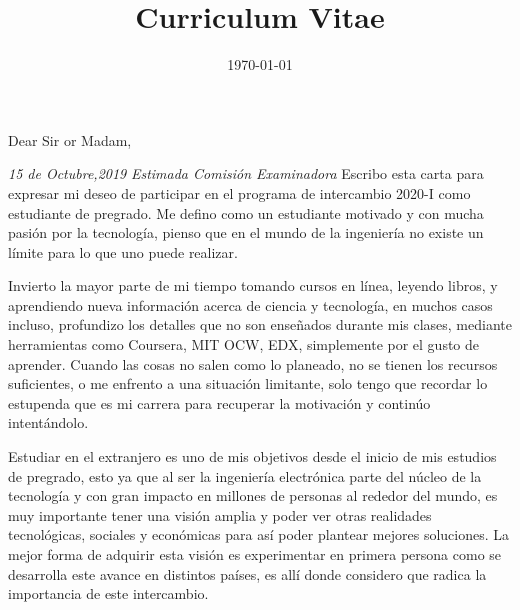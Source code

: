 \documentclass[12pt,a4paper,roman]{moderncv} %
\title{Curriculum Vitae}
\begin{document}


\clearpage

\date{\today} %
\opening{Dear Sir or Madam,} %

\justify
\textit{15 de Octubre,2019}\newline\newline
\textit{Estimada Comisión Examinadora}\newline\newline
Escribo esta carta para expresar mi deseo de participar en el programa de intercambio 2020-I como estudiante de pregrado. Me defino como un estudiante motivado y con mucha pasión por la tecnología, pienso que en el mundo de la ingeniería no existe un límite para lo que uno puede realizar.

Invierto la mayor parte de mi tiempo tomando cursos en línea, leyendo libros, y aprendiendo nueva información acerca de ciencia y tecnología, en muchos casos incluso, profundizo los detalles que no son enseñados durante mis clases, mediante herramientas como Coursera, MIT OCW, EDX, simplemente por el gusto de aprender. Cuando las cosas no salen como lo planeado, no se tienen los recursos suficientes, o me enfrento a una situación limitante, solo tengo que recordar lo estupenda que es mi carrera para recuperar la motivación y continúo intentándolo.

Estudiar en el extranjero es uno de mis objetivos desde el inicio de mis estudios de pregrado, esto ya que al ser la ingeniería electrónica parte del núcleo de la tecnología y con gran impacto en millones de personas al rededor del mundo, es muy importante tener una visión amplia y poder ver otras realidades tecnológicas, sociales y económicas para así poder plantear mejores soluciones. La mejor forma de adquirir esta visión es experimentar en primera persona como se desarrolla este avance en distintos países, es allí donde considero que radica la importancia de este intercambio.
\end{document}
